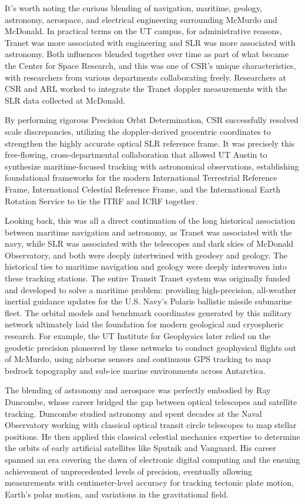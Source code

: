 It’s worth noting the curious blending of navigation, maritime, geology, astronomy, aerospace, and electrical engineering surrounding McMurdo and McDonald. In practical terms on the UT campus, for administrative reasons, Tranet was more associated with engineering and SLR was more associated with astronomy. Both influences blended together over time as part of what became the Center for Space Research, and this was one of CSR’s unique characteristics, with researchers from various departments collaborating freely. Researchers at CSR and ARL worked to integrate the Tranet doppler measurements with the SLR data collected at McDonald. 

By performing rigorous Precision Orbit Determination, CSR successfully resolved scale discrepancies, utilizing the doppler-derived geocentric coordinates to strengthen the highly accurate optical SLR reference frame. It was precisely this free-flowing, cross-departmental collaboration that allowed UT Austin to synthesize maritime-focused tracking with astronomical observations, establishing foundational frameworks for the modern International Terrestrial Reference Frame, International Celestial Reference Frame, and the International Earth Rotation Service to tie the ITRF and ICRF together.

Looking back, this was all a direct continuation of the long historical association between maritime navigation and astronomy, as Tranet was associated with the navy, while SLR was associated with the telescopes and dark skies of McDonald Observatory, and both were deeply intertwined with geodesy and geology. The historical ties to maritime navigation and geology were deeply interwoven into these tracking stations. The entire Transit Tranet system was originally funded and developed to solve a maritime problem: providing high-precision, all-weather inertial guidance updates for the U.S. Navy’s Polaris ballistic missile submarine fleet. The orbital models and benchmark coordinates generated by this military network ultimately laid the foundation for modern geological and cryospheric research. For example, the UT Institute for Geophysics later relied on the geodetic precision pioneered by these networks to conduct geophysical flights out of McMurdo, using airborne sensors and continuous GPS tracking to map bedrock topography and sub-ice marine environments across Antarctica.

The blending of astronomy and aerospace was perfectly embodied by Ray Duncombe, whose career bridged the gap between optical telescopes and satellite tracking. Duncombe studied astronomy and spent decades at the Naval Observatory working with classical optical transit circle telescopes to map stellar positions. He then applied this classical celestial mechanics expertise to determine the orbits of early artificial satellites like Sputnik and Vanguard. His career spanned an era covering the dawn of electronic digital computing and the ensuing achievement of unprecedented levels of precision, eventually allowing measurements with centimeter-level accuracy for tracking tectonic plate motion, Earth's polar motion, and variations in the gravitational field.


